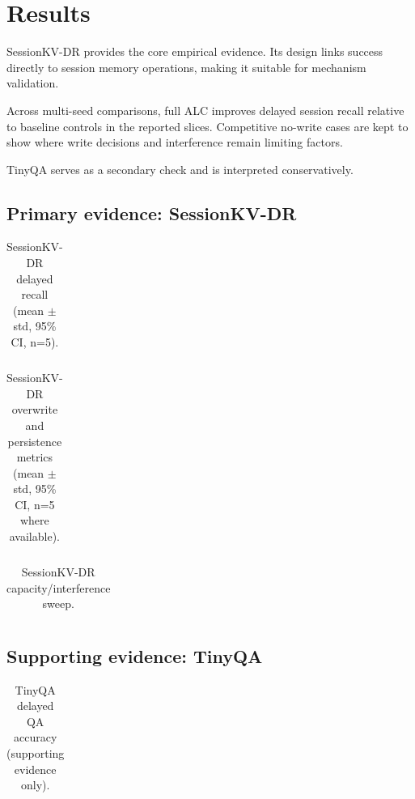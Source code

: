 \section{Results}
SessionKV-DR provides the core empirical evidence. Its design links success directly to session memory operations, making it suitable for mechanism validation.

Across multi-seed comparisons, full ALC improves delayed session recall relative to baseline controls in the reported slices. Competitive no-write cases are kept to show where write decisions and interference remain limiting factors.

TinyQA serves as a secondary check and is interpreted conservatively.

\subsection{Primary evidence: SessionKV-DR}
\begin{table}[h]
\centering
\begin{tabular}{llll}
\toprule

\bottomrule
\end{tabular}
\caption{SessionKV-DR delayed recall (mean $\pm$ std, 95\% CI, n=5).}
\end{table}

\begin{table}[h]
\centering
\begin{tabular}{llll}
\toprule

\bottomrule
\end{tabular}
\caption{SessionKV-DR overwrite and persistence metrics (mean $\pm$ std, 95\% CI, n=5 where available).}
\end{table}

\begin{table}[h]
\centering
\begin{tabular}{llll}
\toprule

\bottomrule
\end{tabular}
\caption{SessionKV-DR capacity/interference sweep.}
\end{table}

\subsection{Supporting evidence: TinyQA}
\begin{table}[h]
\centering
\begin{tabular}{llll}
\toprule

\bottomrule
\end{tabular}
\caption{TinyQA delayed QA accuracy (supporting evidence only).}
\end{table}

